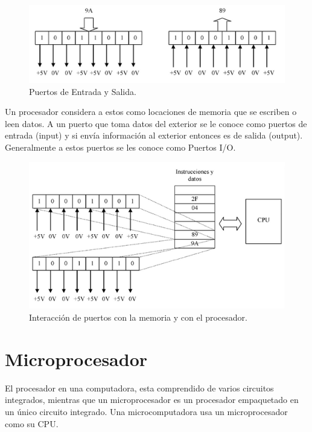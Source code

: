 \documentclass[letterpaper,12pt,oneside]{book}
\begin{document}
				\begin{figure}[!htpb]
					\centering
					\includegraphics[scale = 1.0]{Material de Consulta/PuertosE-S.PNG}
					\caption[Puertos de Entrada y Salida]{Puertos de Entrada y Salida.}
					\label{PrtsES}
				\end{figure}

				Un procesador considera a estos como locaciones de memoria que se escriben o leen datos. A un puerto que toma datos del exterior se le conoce como puertos de entrada (input) y si envía información al exterior entonces es de salida (output). Generalmente a estos puertos se les conoce como Puertos I/O.

				\begin{figure}[!htpb]
					\centering
					\includegraphics[scale = 1.0]{Material de Consulta/PrtsIO.PNG}
					\caption[Memoria y Puertos I/O]{Interacción de puertos con la memoria y con el procesador.}
					\label{PrtsIO}
				\end{figure}

		\section{Microprocesador}
		El procesador en una computadora, esta comprendido de varios circuitos integrados, mientras que un microprocesador es un procesador empaquetado en un único circuito integrado. Una microcomputadora usa un microprocesador como su CPU\cite{valdes2007microcontroladores}.
\end{document}
